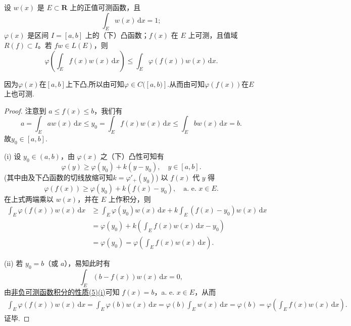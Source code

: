 \documentclass[../../main.tex]{subfiles}
\begin{document}
\begin{theorem}[Jensen不等式]\label{theorem:Jensen不等式}
设 $w(x)$ 是 $E \subset \mathbf{R}$ 上的正值可测函数，且
\[
\int_E w(x) \, \mathrm{d}x = 1;
\]
$\varphi(x)$ 是区间 $I = [a,b]$ 上的（下）凸函数；$f(x)$ 在 $E$ 上可测，且值域 $R(f) \subset I$。若 $fw \in L(E)$，则
\[
\varphi\left( \int_E f(x)w(x) \, \mathrm{d}x \right) \leqslant \int_E \varphi(f(x))w(x) \, \mathrm{d}x.
\]
\end{theorem}
\begin{remark}
因为$\varphi(x)$在$[a,b]$上下凸,所以由可知$\varphi \in C([a,b)]$.从而由可知$\varphi(f(x))$在$E$上也可测.
\end{remark}
\begin{proof}
注意到 $a \leqslant f(x) \leqslant b$，我们有
\[
a=\int_E{aw(x)\,\mathrm{d}x}\leqslant y_0=\int_E{f(x)w(x)\,\mathrm{d}x}\leqslant \int_E{bw(x)\,\mathrm{d}x}=b.
\]
故$y_0\in[a,b]$.

(i) 设 $y_0 \in (a,b)$，由 $\varphi(x)$ 之（下）凸性可知有
\[
\varphi(y) \geqslant \varphi(y_0) + k(y - y_0), \quad y \in [a,b].
\]
(其中由及下凸函数的切线放缩可知$k=\varphi'_+(y_0)$)
以 $f(x)$ 代 $y$ 得
\[
\varphi(f(x)) \geqslant \varphi(y_0) + k(f(x) - y_0), \quad \text{a. e. } x \in E.
\]
在上式两端乘以 $w(x)$，并在 $E$ 上作积分，则
\begin{align*}
\int_E \varphi(f(x))w(x) \, \mathrm{d}x &\geqslant \int_E \varphi(y_0)w(x) \, \mathrm{d}x + k \int_E (f(x) - y_0)w(x) \, \mathrm{d}x \\
&= \varphi(y_0) + k \left( \int_E f(x)w(x) \, \mathrm{d}x - y_0 \right) \\
&= \varphi(y_0) = \varphi\left( \int_E f(x)w(x) \, \mathrm{d}x \right).
\end{align*}

(ii) 若 $y_0 = b$（或 $a$），易知此时有
\[
\int_E (b - f(x))w(x) \, \mathrm{d}x = 0,
\]
由\hyperref[theorem:非负可测函数积分的性质]{非负可测函数积分的性质(5)(i)}可知 $f(x) = b$，a. e. $x \in E$，从而
\begin{align*}
\int_E \varphi(f(x))w(x) \, \mathrm{d}x = \int_E \varphi(b)w(x) \, \mathrm{d}x 
= \varphi(b) \int_E w(x) \, \mathrm{d}x = \varphi(b) 
= \varphi\left( \int_E f(x)w(x) \, \mathrm{d}x \right).
\end{align*}
证毕.
\end{proof}
\end{document}
